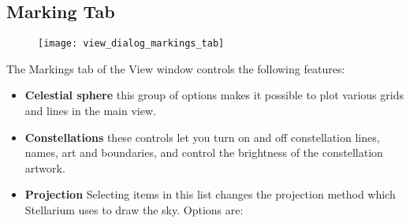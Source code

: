 \subsection{Marking Tab}\label{marking-tab}

\begin{figure}[h]
\centering\texttt{[image: view\_dialog\_markings\_tab]}
\end{figure}

The Markings tab of the View window controls the following features:

\begin{itemize}
\item
  \textbf{Celestial sphere} this group of options makes it possible to
  plot various grids and lines in the main view.
\item
  \textbf{Constellations} these controls let you turn on and off
  constellation lines, names, art and boundaries, and control the
  brightness of the constellation artwork.
\item
  \textbf{Projection} Selecting items in this list changes the
  projection method which Stellarium uses to draw the sky. Options are:


\end{itemize}
